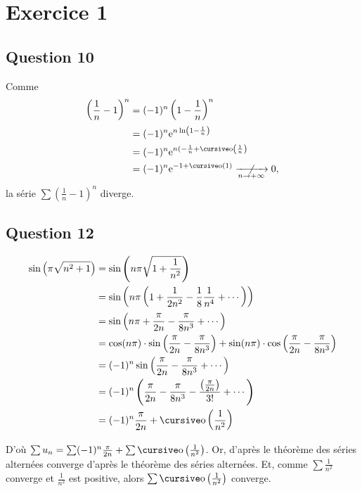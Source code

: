 \section{Exercice 1}

\subsection{Question 10}

Comme
\begin{align*}
	\left( \frac{1}{n} - 1 \right)^n &= (-1)^n \left( 1 - \frac{1}{n} \right)^n \\
	&= (-1)^n \mathrm{e}^{n \ln\left( 1 - \frac{1}{n} \right)} \\
	&= (-1)^n \mathrm{e}^{n(-\frac{1}{n} + \po\left( \frac{1}{n} \right)} \\
	&= (-1)^n \mathrm{e}^{-1 + \po(1)} \centernot{\tendsto{n\to +\infty}} 0, \\
\end{align*}
la série $\sum \left( \frac{1}{n} - 1 \right)^n$\/ diverge.

\subsection{Question 12}

\begin{align*}
	\sin\left( \pi\sqrt{n^2 + 1} \right) &= \sin\left( n \pi\sqrt{1 + \frac{1}{n^2}} \right) \\
	&= \sin\left( n\pi\left( 1 + \frac{1}{2n^2} - \frac{1}{8} \frac{1}{n^4} + \cdots \right) \right) \\
	&= \sin\left( n\pi + \frac{\pi}{2n} - \frac{\pi}{8n^3} + \cdots \right) \\
	&= \cos(n\pi) \cdot \sin\left( \frac{\pi}{2n} - \frac{\pi}{8n^3} \right) + \sin(n\pi) \cdot \cos\left( \frac{\pi}{2n} - \frac{\pi}{8n^3} \right) \\
	&= (-1)^n \sin\left( \frac{\pi}{2n} - \frac{\pi}{8n^3} + \cdots \right) \\
	&= (-1)^n \left( \frac{\pi}{2n} - \frac{\pi}{8n^3} - \frac{\left(\frac{\pi}{2n}\right)}{3!} + \cdots \right) \\
	&= (-1)^n \frac{\pi}{2n} + \po\left( \frac{1}{n^2} \right) \\
\end{align*}

D'où $\sum u_n = \sum (-1)^n \frac{\pi}{2n} + \sum \po\left( \frac{1}{n^2} \right)$. Or, d'après le théorème des séries alternées converge d'après le théorème des séries alternées.
Et, comme $\sum \frac{1}{n^2}$\/ converge et $\frac{1}{n^2}$\/ est positive, alors $\sum \po\left( \frac{1}{n^2} \right)$\/ converge.

